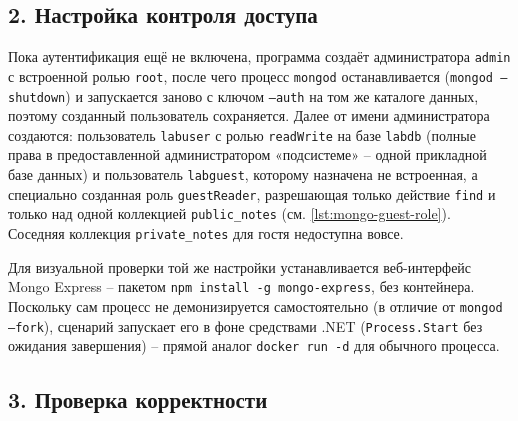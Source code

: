 \subsection*{2. Настройка контроля доступа}

Пока аутентификация ещё не включена, программа создаёт администратора
\texttt{admin} с встроенной ролью \texttt{root}, после чего процесс
\texttt{mongod} останавливается (\texttt{mongod --shutdown}) и
запускается заново с ключом \texttt{--auth} на том же каталоге данных,
поэтому созданный пользователь сохраняется. Далее от имени
администратора создаются: пользователь \texttt{labuser} с ролью
\texttt{readWrite} на базе \texttt{labdb} (полные права в предоставленной
администратором «подсистеме» -- одной прикладной базе данных) и
пользователь \texttt{labguest}, которому назначена не встроенная, а
специально созданная роль \texttt{guestReader}, разрешающая только
действие \texttt{find} и только над одной коллекцией
\texttt{public\_notes} (см. \autoref{lst:mongo-guest-role}). Соседняя
коллекция \texttt{private\_notes} для гостя недоступна вовсе.


Для визуальной проверки той же настройки устанавливается веб-интерфейс
Mongo Express -- пакетом \texttt{npm install -g mongo-express}, без
контейнера. Поскольку сам процесс не демонизируется самостоятельно (в
отличие от \texttt{mongod --fork}), сценарий запускает его в фоне
средствами .NET (\texttt{Process.Start} без ожидания завершения) --
прямой аналог \texttt{docker run -d} для обычного процесса.

\subsection*{3. Проверка корректности}


